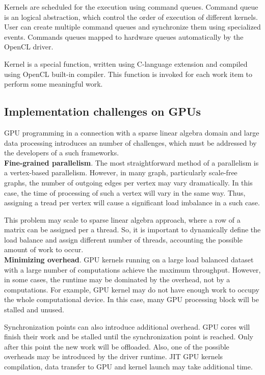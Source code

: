 Kernels are scheduled for the execution using command queues. Command queue is an logical abstraction, which control the order of execution of different kernels. User can create multiple command queues and synchronize them using specialized events. Commands queues mapped to hardware queues automatically by the OpenCL driver.

Kernel is a special function, written using C-language extension and compiled using OpenCL built-in compiler. This function is invoked for each work item to perform some meaningful work.\\

\subsection{Implementation challenges on GPUs}

GPU programming in a connection with a sparse linear algebra domain and large data processing introduces an number of challenges, which must be addressed by the developers of a such frameworks.\\

\textbf{Fine-grained parallelism}. The most straightforward method of a parallelism is a vertex-based parallelism. However, in many graph, particularly scale-free graphs, the number of outgoing edges per vertex may vary dramatically. In this case, the time of processing of such a vertex will vary in the same way. Thus, assigning a tread per vertex will cause a significant load imbalance in a such case. 

This problem may scale to sparse linear algebra approach, where a row of a matrix can be assigned per a thread. So, it is important to dynamically define the load balance and assign different number of threads, accounting the possible amount of work to occur.\\

\textbf{Minimizing overhead}. GPU kernels running on a large load balanced dataset with a large number of computations achieve the maximum throughput. However, in some cases, the runtime may be dominated by the overhead, not by a computations. For example, GPU kernel may do not have enough work to occupy the whole computational device. In this case, many GPU processing block will be stalled and unused. 

Synchronization points can also introduce additional overhead. GPU cores will finish their work and be stalled until the synchronization point is reached. Only after this point the new work will be offloaded. Also, one of the possible overheads may be introduced by the driver runtime. JIT GPU kernels compilation, data transfer to GPU and kernel launch may take additional time.\\

